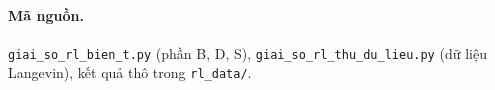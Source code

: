 \documentclass[11pt,a4paper]{article}
\theoremstyle{remark}
\begin{document}
\paragraph{Mã nguồn.} \texttt{giai\_so\_rl\_bien\_t.py} (phần B, D, S), \texttt{giai\_so\_rl\_thu\_du\_lieu.py} (dữ liệu Langevin), kết quả thô trong \texttt{rl\_data/}.
\end{document}
